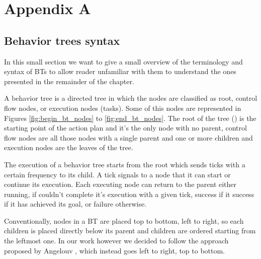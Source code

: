 \chapter{Appendix A}

\label{section:behaviour_tree_syntax}
\section{Behavior trees syntax}

In this small section we want to give a small overview of the terminology and syntax of BTs to allow reader unfamiliar with them to understand the ones presented in the remainder of the chapter.

A behavior tree is a directed tree in which the nodes are classified as root, control flow nodes, or execution nodes (tasks). Some of this nodes are represented in Figures \ref{fig:begin_bt_nodes} to \ref{fig:end_bt_nodes}.
The root of the tree () is the starting point of the action plan and it’s the only node with no parent, control flow nodes are all those nodes with a single parent and one or more children and execution nodes are the leaves of the tree. 

The execution of a behavior tree starts from the root which sends ticks with a certain frequency to its child. A tick signals to a node that it can start or continue its execution. Each executing node can return to the parent either running, if couldn’t complete it’s execution with a given tick, success if it success if it has achieved its goal, or failure otherwise. 

Conventionally, nodes in a BT are placed top to bottom, left to right, so each children is placed directly below its parent and children are ordered starting from the leftmost one. In our work however we decided to follow the approach proposed by Angelouv \cite{bt_abuse}, which instead goes left to right, top to bottom.

